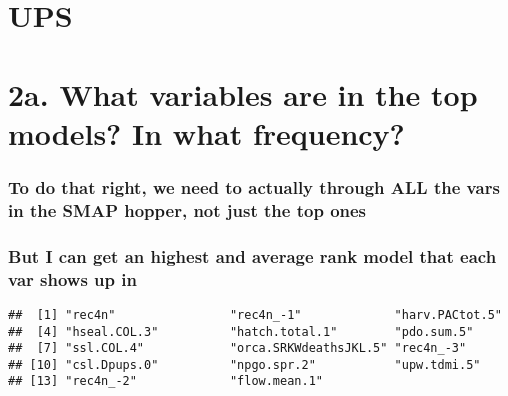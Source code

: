 \documentclass[
]{article}
\newenvironment{Shaded}{\begin{snugshade}}{\end{snugshade}}
\newcommand{\FunctionTok}[1]{\textcolor[rgb]{0.00,0.00,0.00}{#1}}
\newcommand{\NormalTok}[1]{#1}
\newcommand{\SpecialCharTok}[1]{\textcolor[rgb]{0.00,0.00,0.00}{#1}}
\begin{document}
\hypertarget{ups}{%
\section{UPS}\label{ups}}

\hypertarget{a.-what-variables-are-in-the-top-models-in-what-frequency-2}{%
\section{2a. What variables are in the top models? In what
frequency?}\label{a.-what-variables-are-in-the-top-models-in-what-frequency-2}}

\hypertarget{to-do-that-right-we-need-to-actually-through-all-the-vars-in-the-smap-hopper-not-just-the-top-ones-1}{%
\subsubsection{To do that right, we need to actually through ALL the
vars in the SMAP hopper, not just the top
ones}\label{to-do-that-right-we-need-to-actually-through-all-the-vars-in-the-smap-hopper-not-just-the-top-ones-1}}

\hypertarget{but-i-can-get-an-highest-and-average-rank-model-that-each-var-shows-up-in-1}{%
\subsubsection{But I can get an highest and average rank model that each
var shows up
in}\label{but-i-can-get-an-highest-and-average-rank-model-that-each-var-shows-up-in-1}}

\begin{Shaded}
\end{Shaded}

\begin{verbatim}
##  [1] "rec4n"                "rec4n_-1"             "harv.PACtot.5"       
##  [4] "hseal.COL.3"          "hatch.total.1"        "pdo.sum.5"           
##  [7] "ssl.COL.4"            "orca.SRKWdeathsJKL.5" "rec4n_-3"            
## [10] "csl.Dpups.0"          "npgo.spr.2"           "upw.tdmi.5"          
## [13] "rec4n_-2"             "flow.mean.1"
\end{verbatim}
\end{document}
